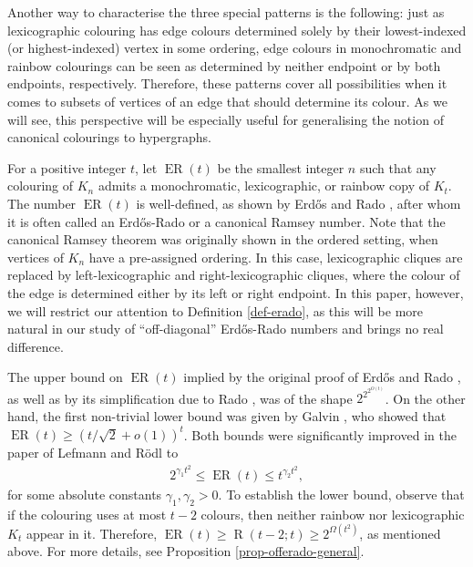 \documentclass[10pt,a4paper]{article}
\theoremstyle{plain}
\theoremstyle{definition}
\newcommand{\eradograph}[1]{\operatorname{ER}(#1)}
\begin{document}
Another way to characterise the three special patterns is the following: just as lexicographic colouring has edge colours determined solely by their lowest-indexed (or highest-indexed) vertex in some ordering, edge colours in monochromatic and rainbow colourings can be seen as determined by neither endpoint or by both endpoints, respectively. Therefore, these patterns cover all possibilities when it comes to subsets of vertices of an edge that should determine its colour. As we will see, this perspective will be especially useful for generalising the notion of canonical colourings to hypergraphs.

For a positive integer $t$, let $\eradograph{t}$ be the smallest integer $n$ such that any colouring of $K_n$ admits a monochromatic, lexicographic, or rainbow copy of $K_t$. The number $\eradograph{t}$ is well-defined, as shown by Erd\H{o}s and Rado \cite{erdos1950combinatorial}, after whom it is often called an Erd\H{o}s-Rado or a canonical Ramsey number. Note that the canonical Ramsey theorem was originally shown in the ordered setting, when vertices of $K_n$ have a pre-assigned ordering. In this case, lexicographic cliques are replaced by left-lexicographic and right-lexicographic cliques, where the colour of the edge is determined either by its left or right endpoint. In this paper, however, we will restrict our attention to Definition \ref{def-erado}, as this will be more natural in our study of ``off-diagonal'' Erd\H{o}s-Rado numbers and brings no real difference.

The upper bound on $\eradograph{t}$ implied by the original proof of Erd\H{o}s and Rado \cite{erdos1950combinatorial}, as well as by its simplification due to Rado \cite{rado1986note}, was of the shape $2^{2^{2^{O(t)}}}$. On the other hand, the first non-trivial lower bound was given by Galvin \cite[p.30]{erdHos1974probabilistic}, who showed that $\eradograph{t}\ge (t/\sqrt{2}+o(1))^t$. Both bounds were significantly improved in the paper of Lefmann and R\"odl \cite{lefmann1995erdHos} to 
\begin{align}\label{eq-lef-rodl-bounds}
    2^{\gamma_1t^2}\le \eradograph{t}\le t^{\gamma_2t^2},
\end{align}
for some absolute constants $\gamma_1,\gamma_2>0$. To establish the lower bound, observe that if the colouring uses at most $t-2$ colours, then neither rainbow nor lexicographic $K_t$ appear in it. Therefore, $\eradograph{t}\geq \operatorname{R}(t-2;t)\geq 2^{\Omega(t^2)}$, as mentioned above. For more details, see Proposition \ref{prop-offerado-general}.
\end{document}
